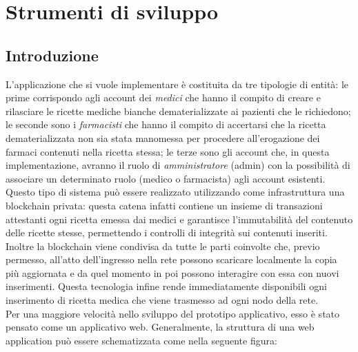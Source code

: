 %
%
\chapter{Strumenti di sviluppo}
%
\label{cap:strumenti}
%
%
\section{Introduzione}
%
L'applicazione che si vuole implementare è costituita da tre tipologie di entità: le prime corrispondo agli account dei \emph{medici} che hanno il compito di creare e rilasciare le ricette mediche bianche dematerializzate ai pazienti che le richiedono; le seconde sono i \emph{farmacisti} che hanno il compito di accertarsi che la ricetta dematerializzata non sia stata manomessa per procedere all'erogazione dei farmaci contenuti nella ricetta stessa; le terze sono gli account che, in questa implementazione, avranno il ruolo di \emph{amministratore} (admin) con la possibilità di associare un determinato ruolo (medico o farmacista) agli account esistenti.\\
Questo tipo di sistema può essere realizzato utilizzando come infrastruttura una blockchain privata: questa catena infatti contiene un insieme di transazioni attestanti ogni ricetta emessa dai medici e garantisce l'immutabilità del contenuto delle ricette stesse, permettendo i controlli di integrità sui contenuti inseriti. Inoltre la blockchain viene condivisa da tutte le parti coinvolte che, previo permesso, all'atto dell'ingresso nella rete possono scaricare localmente la copia più aggiornata e da quel momento in poi possono interagire con essa con nuovi inserimenti. Questa tecnologia infine rende immediatamente disponibili ogni inserimento di ricetta medica che viene trasmesso ad ogni nodo della rete. \\ 
Per una maggiore velocità nello sviluppo del prototipo applicativo, esso è stato pensato come un applicativo web. Generalmente, la struttura di una web application può essere schematizzata come nella seguente figura:
